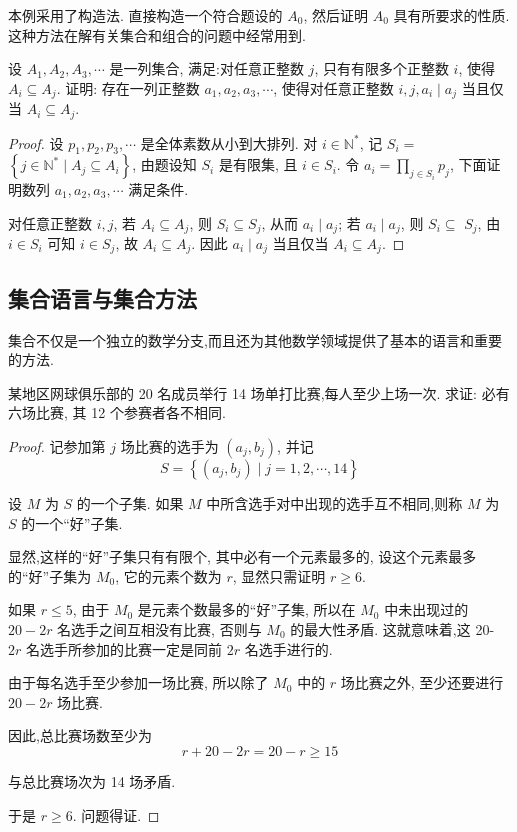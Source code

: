 \begin{note}
	本例采用了构造法. 直接构造一个符合题设的 $A_{0}$, 然后证明 $A_{0}$ 具有所要求的性质. 这种方法在解有关集合和组合的问题中经常用到.
\end{note}

\begin{example}
	设 $A_{1}, A_{2}, A_{3}, \cdots$ 是一列集合, 满足:对任意正整数 $j$, 只有有限多个正整数 $i$, 使得 $A_{i} \subseteq A_{j}$. 证明: 存在一列正整数 $a_{1}, a_{2}, a_{3}, \cdots$, 使得对任意正整数 $i ,  j, a_{i} \mid a_{j}$ 当且仅当 $A_{i} \subseteq A_{j}$.
\end{example}
\begin{proof}
	设 $p_{1}, p_{2}, p_{3}, \cdots$ 是全体素数从小到大排列. 对 $i \in \mathbb{N}^{*}$, 记 $S_{i}=$ $\left\{j \in \mathbb{N}^{*} \mid A_{j} \subseteq A_{i}\right\}$, 由题设知 $S_{i}$ 是有限集, 且 $i \in S_{i}$. 令 $a_{i}=\prod_{j \in S_{i}} p_{j}$, 下面证明数列 $a_{1}, a_{2}, a_{3}, \cdots$ 满足条件.

	对任意正整数 $i ,  j$, 若 $A_{i} \subseteq A_{j}$, 则 $S_{i} \subseteq S_{j}$, 从而 $a_{i} \mid a_{j}$; 若 $a_{i} \mid a_{j}$, 则 $S_{i} \subseteq$ $S_{j}$, 由 $i \in S_{i}$ 可知 $i \in S_{j}$, 故 $A_{i} \subseteq A_{j}$. 因此 $a_{i} \mid a_{j}$ 当且仅当 $A_{i} \subseteq A_{j}$.
\end{proof}

\subsection{集合语言与集合方法}
集合不仅是一个独立的数学分支,而且还为其他数学领域提供了基本的语言和重要的方法.
\begin{example}
	某地区网球俱乐部的 20 名成员举行 14 场单打比赛,每人至少上场一次. 求证: 必有六场比赛, 其 12 个参赛者各不相同.
\end{example}
\begin{proof}
	记参加第 $j$ 场比赛的选手为 $\left(a_{j}, b_{j}\right)$, 并记
	$$
		S=\left\{\left(a_{j}, b_{j}\right) \mid j=1,2, \cdots, 14\right\}
	$$

	设 $M$ 为 $S$ 的一个子集. 如果 $M$ 中所含选手对中出现的选手互不相同,则称 $M$ 为 $S$ 的一个“好”子集.

	显然,这样的“好”子集只有有限个, 其中必有一个元素最多的, 设这个元素最多的“好”子集为 $M_{0}$, 它的元素个数为 $r$, 显然只需证明 $r \geqslant 6$.

	如果 $r \leqslant 5$, 由于 $M_{0}$ 是元素个数最多的“好”子集, 所以在 $M_{0}$ 中未出现过的 $20-2 r$ 名选手之间互相没有比赛, 否则与 $M_{0}$ 的最大性矛盾. 这就意味着,这 20- $2 r$ 名选手所参加的比赛一定是同前 $2 r$ 名选手进行的.

	由于每名选手至少参加一场比赛, 所以除了 $M_{0}$ 中的 $r$ 场比赛之外, 至少还要进行 $20-2 r$ 场比赛.

	因此,总比赛场数至少为
	$$
		r+20-2 r=20-r \geqslant 15
	$$

	与总比赛场次为 14 场矛盾.

	于是 $r \geqslant 6$. 问题得证.
\end{proof}


